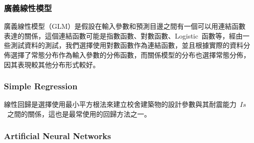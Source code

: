 
\subsubsection{廣義線性模型}

廣義線性模型（GLM）是假設在輸入參數和預測目邊之間有一個可以用連結函數表達的關係，這個連結函數可能是指數函數、對數函數、Logistic~函數等，經由一些測試資料的測試，我們選擇使用對數函數作為連結函數，並且根據實際的資料分佈選擇了常態分布作為輸入參數的分佈函數，而關係模型的分布也選擇常態分佈，因其表現較其他分布形式較好。


\subsubsection{Simple Regression}

線性回歸是選擇使用最小平方根法來建立校舍建築物的設計參數與其耐震能力~$Is$~之間的關係，這也是最常使用的回歸方法之一。


\subsubsection{Artificial Neural Networks}

